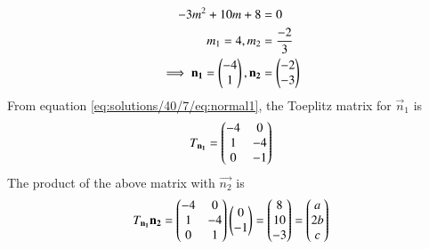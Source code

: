 \begin{enumerate}
\begin{align}
    -3m^2+10m+8&=0\\
    m_1=4,  m_2&=\frac{-2}{3}\\
   \implies  \mathbf{n_1}=\begin{pmatrix}-4\\ 1\end{pmatrix}, \mathbf{n_2}&=\begin{pmatrix}-2\\-3\end{pmatrix} \label{eq:solutions/40/7/eq:normal1}
\end{align}
%
From equation \eqref{eq:solutions/40/7/eq:normal1},
the Toeplitz matrix for $\vec{n}_1$ is
\begin{align}
    T_{\mathbf{n_1}}=\begin{pmatrix}-4&0\\1&-4\\0&-1\end{pmatrix}
\end{align}
The product of the above matrix with $\vec{n_2}$ is
\begin{align}
T_{\vec{n_1}}    \vec{n_2}=
\myvec{-4&0\\1&-4\\0&1}\myvec{0\\ -1} = \myvec{8\\10\\-3}  =\myvec{a\\2b\\c}\label{eq:solutions/40/7/eq:conv3}

\end{align}
\end{enumerate}
